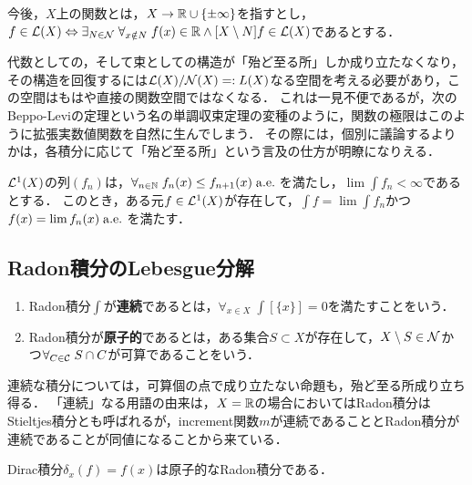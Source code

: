 \documentclass[uplatex,dvipdfmx]{jsreport}
\begin{document}
\begin{definition}
    今後，$X$上の関数とは，$X\to\mathbb{R}\cup\{\pm\infty\}$を指すとし，$f\in\mathcal{L}(X)\Leftrightarrow\exists_{N\in\mathcal{N}}\;\forall_{x\notin N}\;f(x)\in\mathbb{R}\land[X\setminus N]f\in\mathcal{L}(X)$であるとする．
\end{definition}
\begin{remarks}
    代数としての，そして束としての構造が「殆ど至る所」しか成り立たなくなり，その構造を回復するには$\mathcal{L}(X)/\mathcal{N}(X)=:L(X)$なる空間を考える必要があり，この空間はもはや直接の関数空間ではなくなる．
    これは一見不便であるが，次のBeppo-Leviの定理という名の単調収束定理の変種のように，関数の極限はこのように拡張実数値関数を自然に生んでしまう．
    その際には，個別に議論するよりかは，各積分に応じて「殆ど至る所」という言及の仕方が明瞭になりえる．
\end{remarks}

\begin{theorem}
    $\mathcal{L}^1(X)$の列$(f_n)$は，$\forall_{n\in\mathbb{N}}\;f_n(x)\le f_{n+1}(x)\;\mathrm{a.e.}\;$を満たし，$\lim\int f_n<\infty$であるとする．
    このとき，ある元$f\in\mathcal{L}^1(X)$が存在して，$\int f=\lim\int f_n$かつ$f(x)=\lim f_n(x)\;\mathrm{a.e.}\;$を満たす．
\end{theorem}

\subsection{Radon積分のLebesgue分解}

\begin{definition}\mbox{}
    \begin{enumerate}
        \item Radon積分$\int$が\textbf{連続}であるとは，$\forall_{x\in X}\;\int[\{x\}]=0$を満たすことをいう．
        \item Radon積分が\textbf{原子的}であるとは，ある集合$S\subset X$が存在して，$X\setminus S\in\mathcal{N}$かつ$\forall_{C\in\mathcal{C}}\;S\cap C$が可算であることをいう．
    \end{enumerate}
\end{definition}
\begin{remarks}
    連続な積分については，可算個の点で成り立たない命題も，殆ど至る所成り立ち得る．
    「連続」なる用語の由来は，$X=\mathbb{R}$の場合においてはRadon積分はStieltjes積分とも呼ばれるが，increment関数$m$が連続であることとRadon積分が連続であることが同値になることから来ている．
\end{remarks}
\begin{example}
    Dirac積分$\delta_x(f)=f(x)$は原子的なRadon積分である．
\end{example}
\end{document}
